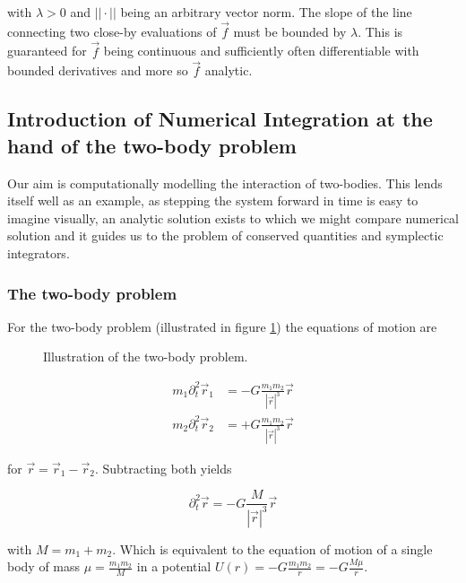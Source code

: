 with $\lambda > 0$ and $||\cdot||$ being an arbitrary vector norm. The slope of the line connecting two close-by evaluations of $\vec{f}$ must be bounded by $\lambda$.
This is guaranteed for $\vec{f}$ being continuous and sufficiently often differentiable with bounded derivatives and more so $\vec{f}$ analytic.

\subsection{Introduction of Numerical Integration at the hand of the two-body problem}
Our aim is computationally modelling the interaction of two-bodies. This lends itself well
as an example, as stepping the system forward in time is easy to imagine visually, an analytic
solution exists to which we might compare numerical solution and it guides us to the problem
of conserved quantities and symplectic integrators.

\subsubsection{The two-body problem}
For the two-body problem (illustrated in figure \ref{fig:two_body_problem}) the equations of motion are

\begin{figure}[!htb]
  \centering
  \hfill
  \caption{Illustration of the two-body problem.}
  \label{fig:two_body_problem}
\end{figure}



\begin{equation}
    \begin{aligned}
        m_1 \partial_t^2 \vec{r}_1 &= - G \frac{m_1 m_2}{|\vec{r}|^3} \vec{r} \\
        m_2 \partial_t^2 \vec{r}_2 &= + G \frac{m_1 m_2}{|\vec{r}|^3} \vec{r}
    \end{aligned}
\end{equation}

for $\vec{r} = \vec{r}_1 - \vec{r}_2$. Subtracting both yields

\begin{equation}
    \partial_t^2 \vec{r} = - G \frac{M}{|\vec{r}|^3} \vec{r}
\end{equation}

with $M = m_1 + m_2$. Which is equivalent to the equation of motion of a single body of mass $\mu = \frac{m_1 m_2}{M}$ in a potential $U(r) = -G \frac{m_1m_2}{r}=-G \frac{M\mu}{r}$.

